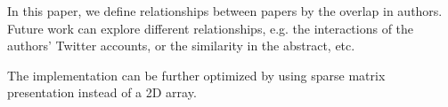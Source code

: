 In this paper, we define relationships between papers by the overlap in authors.
Future work can explore different relationships, e.g. the interactions of the authors' Twitter accounts, or the similarity in the abstract, etc.

The implementation can be further optimized by using sparse matrix presentation instead of a 2D array.
